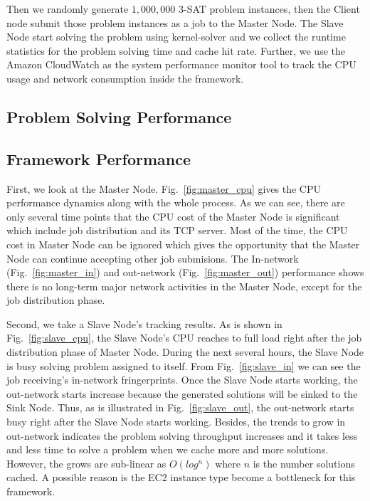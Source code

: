 Then we randomly generate $1,000,000$ 3-SAT problem instances, then the Client node submit those problem instances as a job to the Master Node. The Slave Node start solving the problem using kernel-solver and we collect the runtime statistics for the problem solving time and cache hit rate. Further, we use the Amazon CloudWatch as the system performance monitor tool to track the CPU usage and network consumption inside the framework.

\subsection{Problem Solving Performance}

\subsection{Framework Performance}
First, we look at the Master Node. Fig.~\ref{fig:master_cpu} gives the CPU performance dynamics along with the whole process. As we can see, there are only several time points that the CPU cost of the Master Node is significant which include job distribution and its TCP server. Most of the time, the CPU cost in Master Node can be ignored which gives the opportunity that the Master Node can continue accepting other job submisions. The In-network (Fig.~\ref{fig:master_in}) and out-network (Fig.~\ref{fig:master_out}) performance shows there is no long-term major network activities in the Master Node, except for the job distribution phase.

Second, we take a Slave Node's tracking results. As is shown in Fig.~\ref{fig:slave_cpu}, the Slave Node's CPU reaches to full load right after the job distribution phase of Master Node. During the next several hours, the Slave Node is busy solving problem assigned to itself. From Fig.~\ref{fig:slave_in} we can see the job receiving's in-network fringerprints. Once the Slave Node starts working, the out-network starts increase because the generated solutions will be sinked to the Sink Node. Thus, as is illustrated in Fig.~\ref{fig:slave_out}, the out-network starts busy right after the Slave Node starts working. Besides, the trends to grow in out-network indicates the problem solving throughput increases and it takes less and less time to solve a problem when we cache more and more solutions. However, the grows are sub-linear as $O(log^n)$ where $n$ is the number solutions cached. A possible reason is the EC2 instance type become a bottleneck for this framework.

